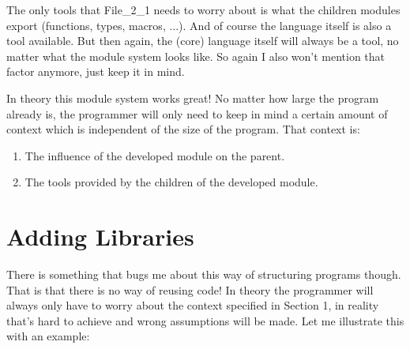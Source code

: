 \documentclass{article}
\begin{document}
The only tools that File\_2\_1 needs to worry about is what the children modules export (functions, types, macros, ...). And of course the language itself is also a tool available. But then again, the (core) language itself will always be a tool, no matter what the module system looks like. So again I also won’t mention that factor anymore, just keep it in mind.

In theory this module system works great! No matter how large the program already is, the programmer will only need to keep in mind a certain amount of context which is independent of the size of the program. That context is:

\begin{enumerate}
    \item The influence of the developed module on the parent.
    \item The tools provided by the children of the developed module.
\end{enumerate}


\section{Adding Libraries}

There is something that bugs me about this way of structuring programs though. That is that there is no way of reusing code! In theory the programmer will always only have to worry about the context specified in Section 1, in reality that’s hard to achieve and wrong assumptions will be made. Let me illustrate this with an example:
\end{document}
